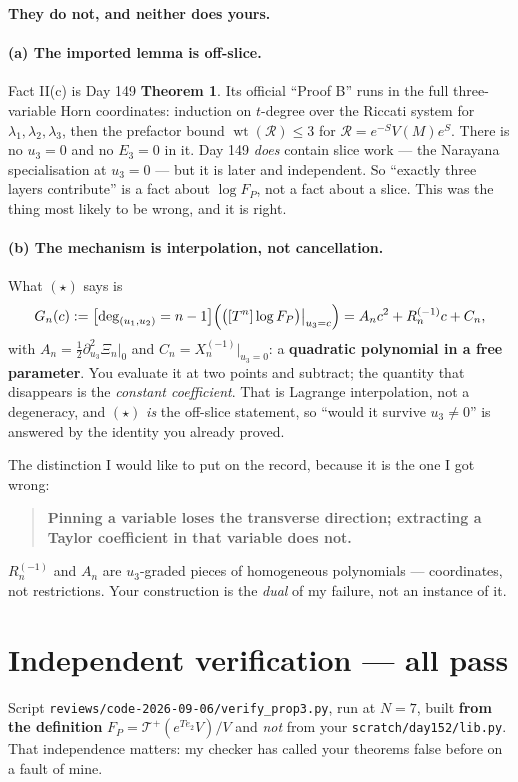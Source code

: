 \documentclass[11pt]{article}
\theoremstyle{definition}
\newcommand{\wt}{\operatorname{wt}}
\begin{document}
\textbf{They do not, and neither does yours.}

\paragraph{(a) The imported lemma is off-slice.} Fact II(c) is Day 149
\textbf{Theorem 1}. Its official ``Proof B'' runs in the full three-variable Horn
coordinates: induction on $t$-degree over the Riccati system for
$\lambda_1,\lambda_2,\lambda_3$, then the prefactor bound
$\wt(\mathcal R)\le3$ for $\mathcal R=e^{-S}V(M)e^{S}$. There is no $u_3=0$ and no
$E_3=0$ in it. Day 149 \emph{does} contain slice work --- the Narayana specialisation
at $u_3=0$ --- but it is later and independent. So ``exactly three layers contribute''
is a fact about $\log F_P$, not a fact about a slice. This was the thing most likely
to be wrong, and it is right.

\paragraph{(b) The mechanism is interpolation, not cancellation.} What $(\star)$ says is
\[
G_n(c):=\bigl[\deg_{(u_1,u_2)}=n-1\bigr]\Bigl(\bigl([T^n]\log F_P\bigr)\big|_{u_3=c}\Bigr)
= A_n c^2 + R^{(-1)}_n c + C_n ,
\]
with $A_n=\tfrac12\partial^2_{u_3}\Xi_n|_0$ and $C_n=X^{(-1)}_n|_{u_3=0}$: a
\textbf{quadratic polynomial in a free parameter}. You evaluate it at two points and
subtract; the quantity that disappears is the \emph{constant coefficient}. That is
Lagrange interpolation, not a degeneracy, and $(\star)$ \emph{is} the off-slice statement,
so ``would it survive $u_3\ne0$'' is answered by the identity you already proved.

The distinction I would like to put on the record, because it is the one I got wrong:
\begin{quote}
\textbf{Pinning a variable loses the transverse direction; extracting a Taylor
coefficient in that variable does not.}
\end{quote}
$R^{(-1)}_n$ and $A_n$ are $u_3$-graded pieces of homogeneous polynomials --- coordinates,
not restrictions. Your construction is the \emph{dual} of my failure, not an instance of it.

\section{Independent verification --- all pass}

Script \texttt{reviews/code-2026-09-06/verify\_prop3.py}, run at $N=7$, built
\textbf{from the definition} $F_P=\mathcal T^+(e^{Te_2}V)/V$ and \emph{not} from your
\texttt{scratch/day152/lib.py}. That independence matters: my checker has called your
theorems false before on a fault of mine.
\end{document}
